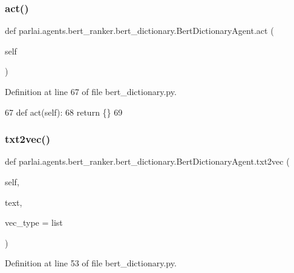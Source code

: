 \subsubsection{\texorpdfstring{act()}{act()}}
{\footnotesize\ttfamily def parlai.\+agents.\+bert\+\_\+ranker.\+bert\+\_\+dictionary.\+Bert\+Dictionary\+Agent.\+act (\begin{DoxyParamCaption}\item[{}]{self }\end{DoxyParamCaption})}



Definition at line 67 of file bert\+\_\+dictionary.\+py.


\begin{DoxyCode}
67     \textcolor{keyword}{def }act(self):
68         \textcolor{keywordflow}{return} \{\}
69 \end{DoxyCode}
\mbox{\label{classparlai_1_1agents_1_1bert__ranker_1_1bert__dictionary_1_1BertDictionaryAgent_a407dcd1aa927f8065334a825b2d099d9}} 
\subsubsection{\texorpdfstring{txt2vec()}{txt2vec()}}
{\footnotesize\ttfamily def parlai.\+agents.\+bert\+\_\+ranker.\+bert\+\_\+dictionary.\+Bert\+Dictionary\+Agent.\+txt2vec (\begin{DoxyParamCaption}\item[{}]{self,  }\item[{}]{text,  }\item[{}]{vec\+\_\+type = {\ttfamily list} }\end{DoxyParamCaption})}



Definition at line 53 of file bert\+\_\+dictionary.\+py.


